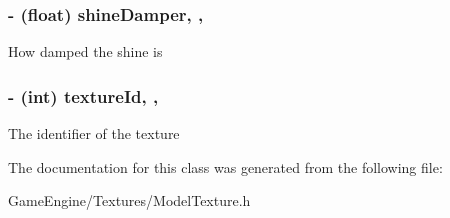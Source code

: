 \subsubsection[{\texorpdfstring{shine\+Damper}{shineDamper}}]{\setlength{\rightskip}{0pt plus 5cm}-\/ (float) shine\+Damper\hspace{0.3cm}{\ttfamily [read]}, {\ttfamily [write]}, {\ttfamily [atomic]}}\hypertarget{interface_model_texture_ad9d65575408a2195c3c8a654e804e8ce}{}\label{interface_model_texture_ad9d65575408a2195c3c8a654e804e8ce}
How damped the shine is 
\subsubsection[{\texorpdfstring{texture\+Id}{textureId}}]{\setlength{\rightskip}{0pt plus 5cm}-\/ (int) texture\+Id\hspace{0.3cm}{\ttfamily [read]}, {\ttfamily [write]}, {\ttfamily [atomic]}}\hypertarget{interface_model_texture_a6036cd5d7473640c480a385695dba581}{}\label{interface_model_texture_a6036cd5d7473640c480a385695dba581}
The identifier of the texture 

The documentation for this class was generated from the following file\+:\begin{DoxyCompactItemize}
\item 
Game\+Engine/\+Textures/Model\+Texture.\+h\end{DoxyCompactItemize}
